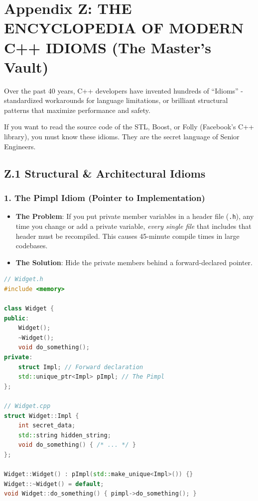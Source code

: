 \hypertarget{appendix-z-the-encyclopedia-of-modern-c-idioms-the-masters-vault}{%
\section{Appendix Z: THE ENCYCLOPEDIA OF MODERN C++ IDIOMS (The Master's
Vault)}\label{appendix-z-the-encyclopedia-of-modern-c-idioms-the-masters-vault}}

Over the past 40 years, C++ developers have invented hundreds of
``Idioms'' - standardized workarounds for language limitations, or
brilliant structural patterns that maximize performance and safety.

If you want to read the source code of the STL, Boost, or Folly
(Facebook's C++ library), you must know these idioms. They are the
secret language of Senior Engineers.

\hypertarget{z.1-structural-architectural-idioms}{%
\subsection{Z.1 Structural \& Architectural
Idioms}\label{z.1-structural-architectural-idioms}}

\hypertarget{the-pimpl-idiom-pointer-to-implementation}{%
\subsubsection{1. The Pimpl Idiom (Pointer to
Implementation)}\label{the-pimpl-idiom-pointer-to-implementation}}

\begin{itemize}
\tightlist
\item
  \textbf{The Problem}: If you put private member variables in a header
  file (\passthrough{\lstinline!.h!}), any time you change or add a
  private variable, \emph{every single file} that includes that header
  must be recompiled. This causes 45-minute compile times in large
  codebases.
\item
  \textbf{The Solution}: Hide the private members behind a
  forward-declared pointer.
\end{itemize}

\begin{lstlisting}[language={C++}]
// Widget.h
#include <memory>

class Widget {
public:
    Widget();
    ~Widget();
    void do_something();
private:
    struct Impl; // Forward declaration
    std::unique_ptr<Impl> pImpl; // The Pimpl
};

// Widget.cpp
struct Widget::Impl {
    int secret_data;
    std::string hidden_string;
    void do_something() { /* ... */ }
};

Widget::Widget() : pImpl(std::make_unique<Impl>()) {}
Widget::~Widget() = default;
void Widget::do_something() { pimpl->do_something(); }
\end{lstlisting}


